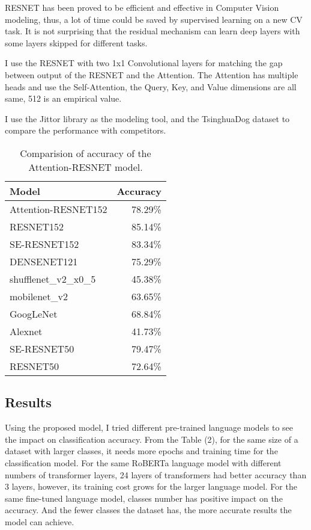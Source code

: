 \documentclass[10pt,twocolumn,letterpaper]{article}
\begin{document}
\par RESNET has been proved to be efficient and effective in Computer Vision modeling, thus, a lot of time could be saved by supervised learning on a new CV task.
It is not surprising that the residual mechanism can learn deep layers with some layers skipped for different tasks.

\par I use the RESNET with two 1x1 Convolutional layers for matching the gap between output of the RESNET and the Attention.
The Attention has multiple heads and use the Self-Attention, the Query, Key, and Value dimensions are all same, 512 is an empirical value.

\par I use the Jittor library as the modeling tool, and the TsinghuaDog dataset to compare the performance with competitors.

\begin{table}
\begin{center}
\begin{tabular}{|l|r|}
\hline
Model   & Accuracy \\
\hline\hline
Attention-RESNET152 &  	78.29\% \\
RESNET152  	&	85.14\% \\
SE-RESNET152  	&	83.34\% \\
\hline
DENSENET121   	&	75.29\% \\
shufflenet\_v2\_x0\_5  &	45.38\% \\
\hline
mobilenet\_v2 & 63.65\%\\
GoogLeNet & 68.84\%\\
Alexnet & 41.73\%\\
\hline
SE-RESNET50 & 79.47\% \\
RESNET50 & 72.64\%\\

\hline
\end{tabular}
\end{center}
\caption{Comparision of accuracy of the Attention-RESNET model.}
\end{table}


\subsection{Results}

Using the proposed model, I tried different pre-trained language models to see the impact on classification accuracy.
From the Table (2), for the same size of a dataset with larger classes, it needs more epochs and training time for the classification model.
For the same RoBERTa language model with different numbers of transformer layers, 24 layers of transformers had better accuracy than 3 layers,
however, its training cost grows for the larger language model.
For the same fine-tuned language model, classes number has positive impact on the accuracy.
And the fewer classes the dataset has, the more accurate results the model can achieve.
\end{document}
